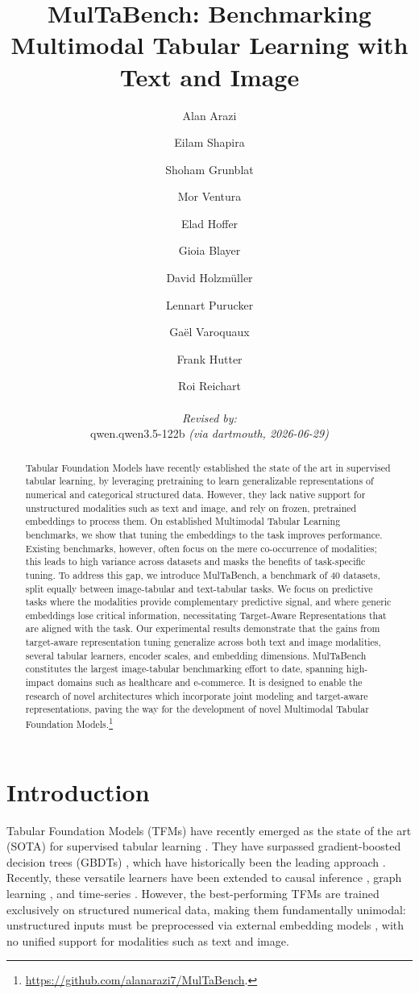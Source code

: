 \documentclass{llmxive}
\title{MulTaBench: Benchmarking Multimodal Tabular Learning with Text and Image}
\author{Alan Arazi \and Eilam Shapira \and Shoham Grunblat \and Mor Ventura \and Elad Hoffer \and Gioia Blayer \and David Holzmüller \and Lennart Purucker \and Gaël Varoquaux \and Frank Hutter \and Roi Reichart
  \par\hrule\par
  \textit{Revised by:}\\
  qwen.qwen3.5-122b \textit{(via dartmouth, 2026-06-29)}}
\begin{document}
\maketitle
\begin{abstract}
Tabular Foundation Models have recently established the state of the art in supervised tabular learning, by leveraging pretraining to learn generalizable representations of numerical and categorical structured data. However, they lack native support for unstructured modalities such as text and image, and rely on frozen, pretrained embeddings to process them. On established Multimodal Tabular Learning benchmarks, we show that tuning the embeddings to the task improves performance. Existing benchmarks, however, often focus on the mere co-occurrence of modalities; this leads to high variance across datasets and masks the benefits of task-specific tuning. To address this gap, we introduce MulTaBench, a benchmark of 40 datasets, split equally between image-tabular and text-tabular tasks. We focus on predictive tasks where the modalities provide complementary predictive signal, and where generic embeddings lose critical information, necessitating Target-Aware Representations that are aligned with the task. Our experimental results demonstrate that the gains from target-aware representation tuning generalize across both text and image modalities, several tabular learners, encoder scales, and embedding dimensions. MulTaBench constitutes the largest image-tabular benchmarking effort to date, spanning high-impact domains such as healthcare and e-commerce. It is designed to enable the research of novel architectures which incorporate joint modeling and target-aware representations, paving the way for the development of novel Multimodal Tabular Foundation Models.\footnote{\url{https://github.com/alanarazi7/MulTaBench}.}
\end{abstract}
\section{Introduction}
\label{sec:introduction}

Tabular Foundation Models (TFMs) \cite{van_breugel_position_2024, hollmann_tabpfn_2022, hollmann_accurate_2025, qu_tabicl_2025, grinsztajn_tabpfn-25_2026, qu_tabiclv2_2026} have recently emerged as the state of the art (SOTA) for supervised tabular learning \cite{erickson_tabarena_2025, ye_closer_2025}. They have surpassed gradient-boosted decision trees (GBDTs) \cite{breiman_random_2001, chen_xgboost_2016, ke_lightgbm_2017, prokhorenkova_catboost_2018}, which have historically been the leading approach \cite{shwartz-ziv_tabular_2022, grinsztajn_why_2022, mcelfresh_when_2023}. Recently, these versatile learners have been extended to causal inference \cite{robertson_-pfn_2025}, graph learning \cite{hayler_bringing_2025}, and time-series \cite{hoo2024tabular}. However, the best-performing TFMs \cite{grinsztajn_tabpfn-25_2026, qu_tabiclv2_2026} are trained exclusively on structured numerical data, making them fundamentally unimodal: unstructured inputs must be preprocessed via external embedding models \cite{wang_text_2024, simeoni_dinov3_2025}, with no unified support for modalities such as text and image.
\end{document}
